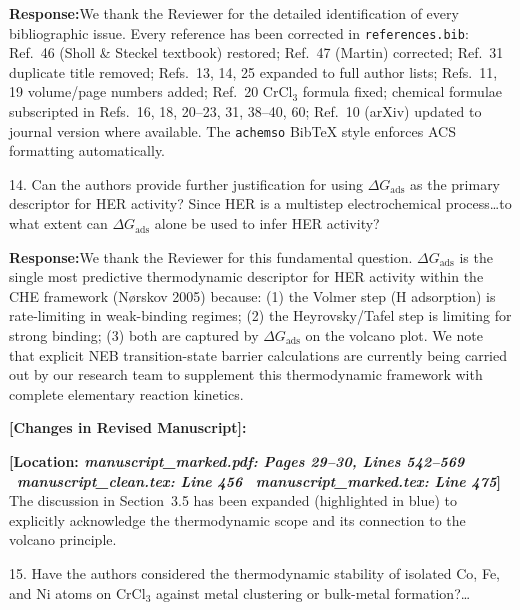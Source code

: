 \documentclass[11pt, sans, a4paper]{moderncv}
\newcommand{\response}{\vspace{0.4em}\noindent\textbf{\color{actionblue}Response:}\hspace{0.5em}}
\newcommand{\manuscriptchange}[1]{\vspace{0.4em}\noindent\textbf{\color{acsblue}[Changes in Revised Manuscript]:}\par\nopagebreak\vspace{0.15em}#1\vspace{0.4em}}
\begin{document}
\response We thank the Reviewer for the detailed identification of every bibliographic issue. Every reference has been corrected in \texttt{references.bib}: Ref.~46 (Sholl \& Steckel textbook) restored; Ref.~47 (Martin) corrected; Ref.~31 duplicate title removed; Refs.~13, 14, 25 expanded to full author lists; Refs.~11, 19 volume/page numbers added; Ref.~20 CrCl$_3$ formula fixed; chemical formulae subscripted in Refs.~16, 18, 20--23, 31, 38--40, 60; Ref.~10 (arXiv) updated to journal version where available. The \texttt{achemso} BibTeX style enforces ACS formatting automatically.

\vspace{0.8em}

\begin{reviewercomment}
14. Can the authors provide further justification for using $\Delta G_{\mathrm{ads}}$ as the primary descriptor for HER activity? Since HER is a multistep electrochemical process\ldots to what extent can $\Delta G_{\mathrm{ads}}$ alone be used to infer HER activity?
\end{reviewercomment}

\response We thank the Reviewer for this fundamental question. $\Delta G_{\mathrm{ads}}$ is the single most predictive thermodynamic descriptor for HER activity within the CHE framework (N{\o}rskov 2005) because: (1) the Volmer step (H adsorption) is rate-limiting in weak-binding regimes; (2) the Heyrovsky/Tafel step is limiting for strong binding; (3) both are captured by $\Delta G_{\mathrm{ads}}$ on the volcano plot. We note that explicit NEB transition-state barrier calculations are currently being carried out by our research team to supplement this thermodynamic framework with complete elementary reaction kinetics.

\manuscriptchange{\textbf{[Location: \textit{manuscript\_marked.pdf: Pages 29--30, Lines 542--569} \textbar\ \textit{manuscript\_clean.tex: Line 456} \textbar\ \textit{manuscript\_marked.tex: Line 475}]}\\ The discussion in Section~3.5 has been expanded (highlighted in blue) to explicitly acknowledge the thermodynamic scope and its connection to the volcano principle.}

\vspace{0.8em}

\begin{reviewercomment}
15. Have the authors considered the thermodynamic stability of isolated Co, Fe, and Ni atoms on $\text{CrCl}_3$ against metal clustering or bulk-metal formation?\ldots
\end{reviewercomment}
\end{document}

